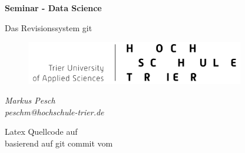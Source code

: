 \begin{titlepage}
  \begin{center}
    \begin{huge}
      \begin{singlespace}
        \textbf{Seminar - Data Science}
      \end{singlespace}
    \end{huge}
    \vspace{1.2cm}
    \begin{Large}
      Das Revisionssystem git
    \end{Large}

    \vspace{0.5cm}

    \begin{figure}[h]
      \centering
      \includegraphics[width=0.85\textwidth]{img//logo.png}
      \label{img:fh-trier-logo}
    \end{figure}

    \vspace{2cm}
    \begin{large}
      \textit{Markus Pesch} \\
      \textit{peschm@hochschule-trier.de}
    \end{large}
    \vspace{2cm}

    Latex Quellcode auf  \\
    basierend auf git commit  vom 


  \end{center}
\end{titlepage}
